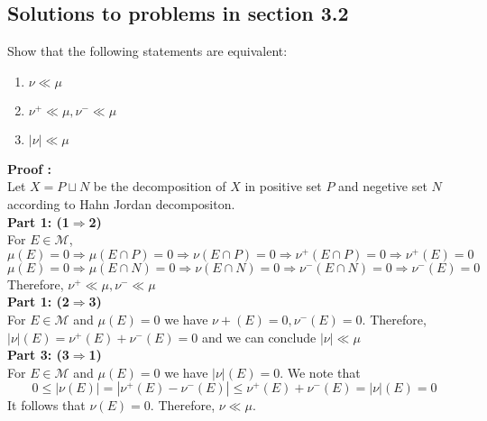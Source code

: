\documentclass[notoc]{tufte-book}
\begin{document}
\subsection{Solutions to problems in section 3.2}



\begin{tcolorbox}[colback=c4,colframe=c3,title=Problem 3.8]
	Show that the following statements are equivalent:
	\begin{enumerate}
		\item $\nu\ll\mu$
		\item $\nu^+\ll\mu,\nu^-\ll\mu$
		\item $|\nu|\ll\mu$
	\end{enumerate}
\end{tcolorbox}
\textbf{Proof :}\\
Let $X=P\sqcup N$ be the decomposition of $X$ in positive set $P$ and negetive set $N$ according to Hahn Jordan decompositon. \\
\textbf{Part 1: (1$\Rightarrow$2)}\\
For $E\in\mathcal{M}$,
$$\mu(E)=0\Rightarrow \mu(E\cap P)=0\Rightarrow\nu(E\cap P)=0\Rightarrow\nu^+(E\cap P)=0\Rightarrow\nu^+(E)=0$$
$$\mu(E)=0\Rightarrow \mu(E\cap N)=0\Rightarrow\nu(E\cap N)=0\Rightarrow\nu^-(E\cap N)=0\Rightarrow\nu^-(E)=0$$
Therefore, $\nu^+\ll\mu,\nu^-\ll\mu$\\
\textbf{Part 1: (2$\Rightarrow$3)}\\
For $E\in\mathcal{M}$ and $\mu(E)=0$ we have $\nu+(E)=0,\nu^-(E)=0$. Therefore,
$|\nu|(E)=\nu^+(E)+\nu^-(E)=0$ and we can conclude $|\nu|\ll\mu$ \\
\textbf{Part 3: (3$\Rightarrow$1)}\\
For $E\in\mathcal{M}$ and $\mu(E)=0$ we have $|\nu|(E)=0$. We note that 
$$0\leq |\nu(E)|=|\nu^+(E)-\nu^-(E)|\leq\nu^+(E)+\nu^-(E)=|\nu|(E)=0$$
It follows that $\nu(E)=0$. Therefore, $\nu\ll\mu$.
\end{document}
